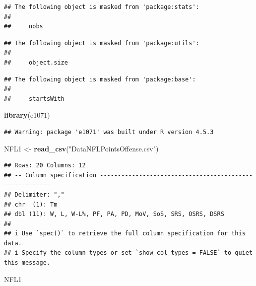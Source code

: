 \documentclass[
]{article}
\newenvironment{Shaded}{\begin{snugshade}}{\end{snugshade}}
\newcommand{\FunctionTok}[1]{\textcolor[rgb]{0.13,0.29,0.53}{\textbf{#1}}}
\newcommand{\NormalTok}[1]{#1}
\newcommand{\OtherTok}[1]{\textcolor[rgb]{0.56,0.35,0.01}{#1}}
\newcommand{\StringTok}[1]{\textcolor[rgb]{0.31,0.60,0.02}{#1}}
\begin{document}
\begin{verbatim}
## The following object is masked from 'package:stats':
## 
##     nobs
\end{verbatim}

\begin{verbatim}
## The following object is masked from 'package:utils':
## 
##     object.size
\end{verbatim}

\begin{verbatim}
## The following object is masked from 'package:base':
## 
##     startsWith
\end{verbatim}

\begin{Shaded}
\begin{Highlighting}[]
\FunctionTok{library}\NormalTok{(e1071)}
\end{Highlighting}
\end{Shaded}

\begin{verbatim}
## Warning: package 'e1071' was built under R version 4.5.3
\end{verbatim}

\begin{Shaded}
\begin{Highlighting}[]
\NormalTok{NFL1 }\OtherTok{\textless{}{-}} \FunctionTok{read\_csv}\NormalTok{(}\StringTok{"DataNFLPointsOffense.csv"}\NormalTok{)}
\end{Highlighting}
\end{Shaded}

\begin{verbatim}
## Rows: 20 Columns: 12
## -- Column specification --------------------------------------------------------
## Delimiter: ","
## chr  (1): Tm
## dbl (11): W, L, W-L%, PF, PA, PD, MoV, SoS, SRS, OSRS, DSRS
## 
## i Use `spec()` to retrieve the full column specification for this data.
## i Specify the column types or set `show_col_types = FALSE` to quiet this message.
\end{verbatim}

\begin{Shaded}
\begin{Highlighting}[]
\NormalTok{NFL1}
\end{Highlighting}
\end{Shaded}
\end{document}
